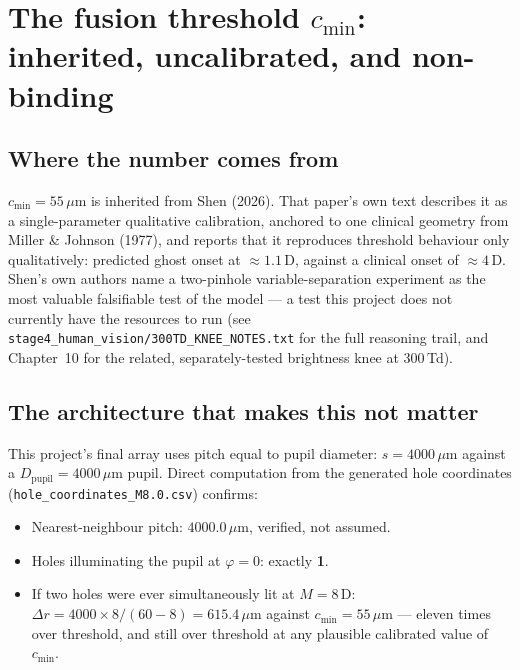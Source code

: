 \documentclass[11pt]{report}
\begin{document}
\section{The fusion threshold $c_{\min}$: inherited, uncalibrated, and non-binding}

\subsection{Where the number comes from}

$c_{\min} = 55\,\mu$m is inherited from Shen (2026). That paper's own text describes it as
a single-parameter qualitative calibration, anchored to one clinical geometry from Miller
\& Johnson (1977), and reports that it reproduces threshold behaviour only qualitatively:
predicted ghost onset at $\approx 1.1$\,D, against a clinical onset of $\approx 4$\,D. Shen's
own authors name a two-pinhole variable-separation experiment as the most valuable
falsifiable test of the model --- a test this project does not currently have the resources
to run (see \texttt{stage4\_human\_vision/300TD\_KNEE\_NOTES.txt} for the full reasoning
trail, and Chapter~10 for the related, separately-tested brightness knee at 300\,Td).

\subsection{The architecture that makes this not matter}

This project's final array uses pitch equal to pupil diameter: $s = 4000\,\mu$m against a
$D_{\text{pupil}} = 4000\,\mu$m pupil. Direct computation from the generated hole
coordinates (\texttt{hole\_coordinates\_M8.0.csv}) confirms:
\begin{itemize}[leftmargin=1.2cm]
\item Nearest-neighbour pitch: $4000.0\,\mu$m, verified, not assumed.
\item Holes illuminating the pupil at $\varphi = 0$: exactly \textbf{1}.
\item If two holes were ever simultaneously lit at $M=8$\,D:
$\Delta r = 4000 \times 8/(60-8) = 615.4\,\mu$m against $c_{\min}=55\,\mu$m --- eleven
times over threshold, and still over threshold at any plausible calibrated value of
$c_{\min}$.
\end{itemize}
\end{document}
